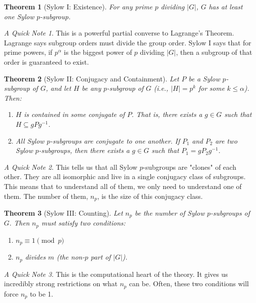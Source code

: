 \documentclass[12pt,a4paper]{article}
\theoremstyle{plain} %
\newtheorem{theorem}{Theorem}[section]
\theoremstyle{definition} %
\theoremstyle{remark} %
\newtheorem*{note}{A Quick Note}
\begin{document}
\begin{theorem}[Sylow I: Existence]
For any prime $p$ dividing $|G|$, $G$ has at least one Sylow $p$-subgroup.
\end{theorem}
\begin{note}
This is a powerful partial converse to Lagrange's Theorem. Lagrange says subgroup orders must divide the group order. Sylow I says that for prime powers, if $p^\alpha$ is the biggest power of $p$ dividing $|G|$, then a subgroup of that order is guaranteed to exist.
\end{note}

\begin{theorem}[Sylow II: Conjugacy and Containment]
Let $P$ be a Sylow $p$-subgroup of $G$, and let $H$ be any $p$-subgroup of $G$ (i.e., $|H|=p^k$ for some $k \le \alpha$). Then:
\begin{enumerate}
    \item $H$ is contained in some conjugate of $P$. That is, there exists a $g \in G$ such that $H \subseteq gPg^{-1}$.
    \item All Sylow $p$-subgroups are conjugate to one another. If $P_1$ and $P_2$ are two Sylow $p$-subgroups, then there exists a $g \in G$ such that $P_1 = gP_2g^{-1}$.
\end{enumerate}
\end{theorem}
\begin{note}
This tells us that all Sylow $p$-subgroups are "clones" of each other. They are all isomorphic and live in a single conjugacy class of subgroups. This means that to understand all of them, we only need to understand one of them. The number of them, $n_p$, is the size of this conjugacy class.
\end{note}

\begin{theorem}[Sylow III: Counting]
Let $n_p$ be the number of Sylow $p$-subgroups of $G$. Then $n_p$ must satisfy two conditions:
\begin{enumerate}
    \item $n_p \equiv 1 \pmod{p}$
    \item $n_p$ divides $m$ (the non-$p$ part of $|G|$).
\end{enumerate}
\end{theorem}
\begin{note}
This is the computational heart of the theory. It gives us incredibly strong restrictions on what $n_p$ can be. Often, these two conditions will force $n_p$ to be 1.
\end{note}
\end{document}
